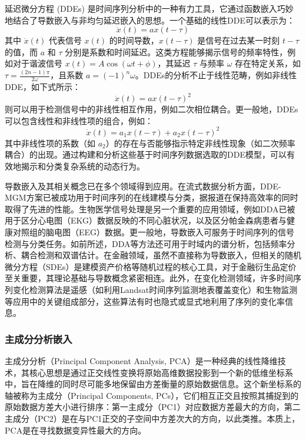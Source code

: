 延迟微分方程 (DDEs) \cite{lainscsek2015delay}是时间序列分析中的一种有力工具，它通过函数嵌入巧妙地结合了导数嵌入与非均匀延迟嵌入的思想。一个基础的线性DDE可以表示为：
\begin{equation}
    \dot{x}(t) = a x(t-\tau)
\end{equation}
其中 $\dot{x}(t)$ 代表信号 $x(t)$ 的时间导数，$x(t-\tau)$ 是信号在过去某一时刻 $t-\tau$ 的值，而 $a$ 和 $\tau$ 分别是系数和时间延迟。这类方程能够揭示信号的频率特性，例如对于谐波信号 $x(t) = A\cos(\omega t + \phi)$，其延迟 $\tau$ 与频率 $\omega$ 存在特定关系，如 $\tau = \frac{(2n-1)\pi}{2\omega}$，且系数 $a = (-1)^n\omega$。DDEs的分析不止于线性范畴，例如非线性DDE，如下式所示：
\begin{equation}
    \dot{x}(t) = a x(t-\tau)^2
\end{equation}
则可以用于检测信号中的非线性相互作用，例如二次相位耦合。更一般地，DDEs可以包含线性和非线性项的组合，例如：
\begin{equation}
    \dot{x}(t) = a_1 x(t-\tau) + a_2 x(t-\tau)^2
\end{equation}
其中非线性项的系数（如 $a_2$）的存在与否能够指示特定非线性现象（如二次频率耦合）的出现。通过构建和分析这些基于时间序列数据选取的DDE模型，可以有效地揭示和分类复杂系统的动态行为。



导数嵌入及其相关概念已在多个领域得到应用。在流式数据分析方面，DDE-MGM方案已被成功用于时间序列的在线建模与分类，据报道在保持高效率的同时取得了先进的性能。生物医学信号处理是另一个重要的应用领域，例如DDA已被用于区分心电图（EKG）数据反映的不同心脏状况，以及区分帕金森病患者与健康对照组的脑电图（EEG）数据。更一般地，导数嵌入可服务于时间序列的信号检测与分类任务。如前所述，DDA等方法还可用于时域内的谱分析，包括频率分析、耦合检测和双谱估计。在金融领域，虽然不直接称为导数嵌入，但相关的随机微分方程（SDEs）是建模资产价格等随机过程的核心工具，对于金融衍生品定价至关重要，其理论基础与导数概念紧密相连。此外，在变化检测领域，许多时间序列变化检测算法是遥感（如利用Landsat时间序列监测地表覆盖变化）和生物监测等应用中的关键组成部分，这些算法有时也隐式或显式地利用了序列的变化率信息。

\subsubsection{主成分分析嵌入}
主成分分析（Principal Component Analysis, PCA）\cite{broomhead1986extracting}是一种经典的线性降维技术，其核心思想是通过正交线性变换将原始高维数据投影到一个新的低维坐标系中，旨在降维的同时尽可能多地保留由方差衡量的原始数据信息。这个新坐标系的轴被称为主成分（Principal Components, PCs），它们相互正交且按照其捕捉到的原始数据方差大小进行排序：第一主成分（PC1）对应数据方差最大的方向，第二主成分（PC2）是在与PC1正交的子空间中方差次大的方向，以此类推。本质上，PCA是在寻找数据变异性最大的方向。

